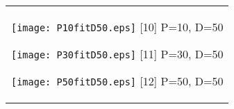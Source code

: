 \documentclass[a4paper,11pt,oneside,openany]{jsbook}
\begin{document}
\begin{figure}[htbp]
  \begin{center}
    \begin{tabular}{c}


      \begin{minipage}{0.33\hsize}
        \begin{center}
          \texttt{[image: P10fitD50.eps]}
          \hspace{1.2cm} [10] P=10, D=50
        \end{center}
      \end{minipage}

      \begin{minipage}{0.33\hsize}
        \begin{center}
          \texttt{[image: P30fitD50.eps]}
          \hspace{1.2cm} [11] P=30, D=50
        \end{center}
      \end{minipage}

      \begin{minipage}{0.33\hsize}
        \begin{center}
          \texttt{[image: P50fitD50.eps]}
          \hspace{1.2cm} [12] P=50, D=50
        \end{center}
      \end{minipage}
    \end{tabular}
  \end{center}
\end{figure}
\end{document}
